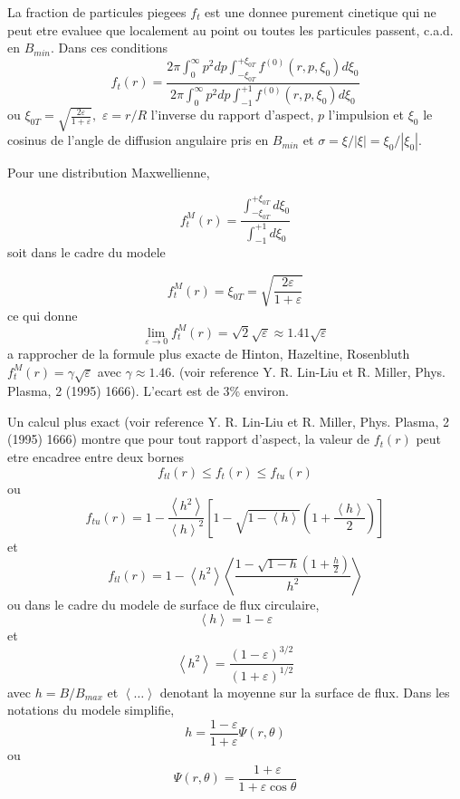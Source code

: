 
La fraction de particules piegees $f_{t}$ est une donnee purement
cinetique qui ne peut etre evaluee que localement au point ou toutes
les particules passent, c.a.d. en $B_{min}$. Dans ces conditions
\[
f_{t}\left(r\right)=\frac{2\pi\int_{0}^{\infty}p^{2}dp\int_{-\xi_{0T}}^{+\xi_{0T}}f^{(0)}\left(r,p,\xi_{0}\right)d\xi_{0}}{2\pi\int_{0}^{\infty}p^{2}dp\int_{-1}^{+1}f^{(0)}\left(r,p,\xi_{0}\right)d\xi_{0}}\]
 ou $\xi_{0T}=\sqrt{\frac{2\varepsilon}{1+\varepsilon}},$ $\varepsilon=r/R$
l'inverse du rapport d'aspect, $p$ l'impulsion et $\xi_{0}$ le cosinus
de l'angle de diffusion angulaire pris en $B_{min}$ et $\sigma=\xi/\left|\xi\right|=\xi_{0}/\left|\xi_{0}\right|.$

Pour une distribution Maxwellienne,

\[
f_{t}^{M}\left(r\right)=\frac{\int_{-\xi_{0T}}^{+\xi_{0T}}d\xi_{0}}{\int_{-1}^{+1}d\xi_{0}}\]
 soit dans le cadre du modele

\[
f_{t}^{M}\left(r\right)=\xi_{0T}=\sqrt{\frac{2\varepsilon}{1+\varepsilon}}\]
 ce qui donne \[
\lim_{\varepsilon\rightarrow0}f_{t}^{M}\left(r\right)=\sqrt{2}\sqrt{\varepsilon}\approx1.41\sqrt{\varepsilon}\]
 a rapprocher de la formule plus exacte de Hinton, Hazeltine, Rosenbluth
$f_{t}^{M}\left(r\right)=\gamma\sqrt{\varepsilon}$ avec $\gamma\approx1.46.$
(voir reference Y. R. Lin-Liu et R. Miller, Phys. Plasma, 2 (1995)
1666). L'ecart est de 3\% environ.

Un calcul plus exact (voir reference Y. R. Lin-Liu et R. Miller, Phys.
Plasma, 2 (1995) 1666) montre que pour tout rapport d'aspect, la valeur
de $f_{t}\left(r\right)$ peut etre encadree entre deux bornes \[
f_{tl}\left(r\right)\leq f_{t}\left(r\right)\leq f_{tu}\left(r\right)\]
 ou \[
f_{tu}\left(r\right)=1-\frac{\left\langle h^{2}\right\rangle }{\left\langle h\right\rangle ^{2}}\left[1-\sqrt{1-\left\langle h\right\rangle }\left(1+\frac{\left\langle h\right\rangle }{2}\right)\right]\]
 et \[
f_{tl}\left(r\right)=1-\left\langle h^{2}\right\rangle \left\langle \frac{1-\sqrt{1-h}\left(1+\frac{h}{2}\right)}{h^{2}}\right\rangle \]
 ou dans le cadre du modele de surface de flux circulaire, \[
\left\langle h\right\rangle =1-\varepsilon\]
 et \[
\left\langle h^{2}\right\rangle =\frac{\left(1-\varepsilon\right)^{3/2}}{\left(1+\varepsilon\right)^{1/2}}\]
 avec $h=B/B_{max}$ et $\left\langle \ldots\right\rangle $ denotant
la moyenne sur la surface de flux. Dans les notations du modele simplifie,
\[
h=\frac{1-\varepsilon}{1+\varepsilon}\Psi\left(r,\theta\right)\]
 ou \[
\Psi\left(r,\theta\right)=\frac{1+\varepsilon}{1+\varepsilon\cos\theta}\]


